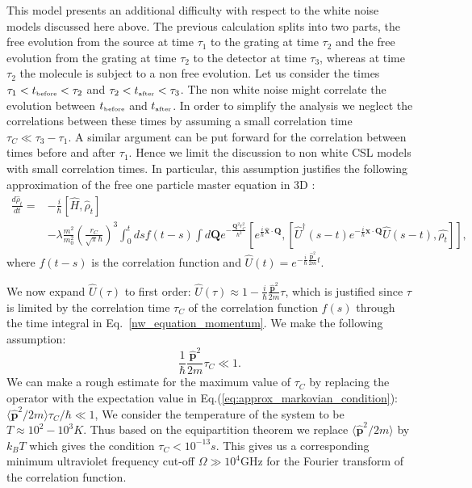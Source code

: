 \documentclass[12pt,groupedaddress,pra,aps]{revtex4-1}
\begin{document}
This model presents an additional difficulty with respect to the white noise models discussed here above. The previous calculation splits into two parts, the free evolution from  the source at time $\tau_1$ to the grating at time $\tau_2$ and the free evolution from the grating at time $\tau_2$ to the detector at time $\tau_3$, whereas at time $\tau_2$ the molecule is subject to a non free evolution. Let us consider the times $\tau_1<t_{\text{\tiny before}}<\tau_2$ and $\tau_2<t_{\text{\tiny after}}<\tau_3$. The non white noise might correlate the evolution between $t_{\text{\tiny before}}$ and $t_{\text{\tiny after}}$. In order to simplify the analysis we neglect the correlations between these times by assuming a small correlation time $\tau_C \ll \tau_3-\tau_1$. A similar argument can be put forward for the correlation between times before and after $\tau_1$. Hence we limit the discussion to non white CSL models with small correlation times. In particular, this assumption justifies the following approximation of the free one particle master equation in 3D \cite{1751-8121-40-50-012,Donadi201470}:
\begin{equation}\label{nw_equation_momentum}
\begin{split}
\frac{d \hat{\rho}_t}{dt} =  &-\frac{i}{\hbar}\left[ \hat{H},
 \hat{\rho}_t\right] \\ 
&-\lambda \frac{m^2}{m_0^2} \left(\frac{r_C}{\sqrt{\pi}\hbar}\right)^3 \int_0^t ds f(t-s) \int  d\bm{Q} e^{-\frac{\bm{Q}^2 r_C^2}{\hbar^2}} [e^{\frac{i}{\hbar}\bm{\hat{x}}\cdot \bm{Q}},[\hat{U}^\dagger(s-t)
e^{-\frac{i}{\hbar}\bm{\hat{x}}\cdot \bm{Q}} \hat{U}(s-t), \hat{\rho_t}]],
\end{split}
\end{equation}
where $f(t-s)$ is the correlation function and $\hat{U}(t)=e^{-\frac{i}{\hbar}\frac{\bm{\hat{p}}^2}{2m}t}$.

We now expand $\hat{U}(\tau)$ to first order: $\hat{U}(\tau)\approx1-\frac{i}{\hbar}\frac{\bm{\hat{p}}^{2}}{2m}\tau$,
which is justified since $\tau$ is limited by the correlation time
$\tau_{C}$ of the correlation function $f(s)$ through the time integral
in Eq.~\eqref{nw_equation_momentum}. We make the following assumption:
\begin{equation}
\frac{1}{\hbar}\frac{\bm{\hat{p}}^{2}}{2m}\tau_{C}\ll1.\label{eq:approx_markovian_condition}
\end{equation}
We can make a rough estimate for the maximum value of $\tau_{C}$
by replacing the operator with the expectation value in Eq.(\ref{eq:approx_markovian_condition}):
$\langle\bm{\hat{p}}^{2}/2m\rangle\tau_{C}/\hbar\ll1$, We consider
the temperature of the system to be $T\approx10^{2}-10^{3}K$. Thus
based on the equipartition theorem we replace $\langle\bm{\hat{p}}^{2}/2m\rangle$ by $k_{B}T$ which gives the condition $\tau_{C}<10^{-13}s$.
This gives us a corresponding minimum ultraviolet frequency cut-off
$\Omega\gg10^4\text{GHz}$ for the Fourier transform of the correlation
function.
\end{document}
